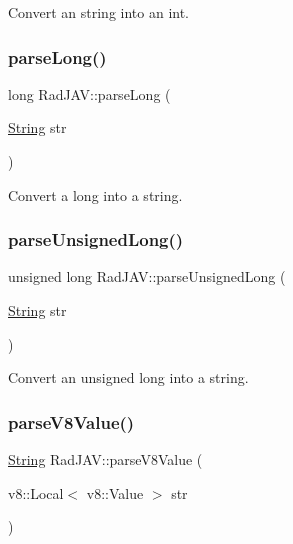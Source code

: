 Convert an string into an int. 

\mbox{\label{namespace_rad_j_a_v_a3ff124a25d6c3f369fb0c6549b8cc715}} 
\subsubsection{\texorpdfstring{parse\+Long()}{parseLong()}}
{\footnotesize\ttfamily long Rad\+J\+A\+V\+::parse\+Long (\begin{DoxyParamCaption}\item[{\mbox{\hyperlink{class_rad_j_a_v_1_1_string}{String}}}]{str }\end{DoxyParamCaption})}



Convert a long into a string. 

\mbox{\label{namespace_rad_j_a_v_ac8f5f34f742526d09fcc982780f97c43}} 
\subsubsection{\texorpdfstring{parse\+Unsigned\+Long()}{parseUnsignedLong()}}
{\footnotesize\ttfamily unsigned long Rad\+J\+A\+V\+::parse\+Unsigned\+Long (\begin{DoxyParamCaption}\item[{\mbox{\hyperlink{class_rad_j_a_v_1_1_string}{String}}}]{str }\end{DoxyParamCaption})}



Convert an unsigned long into a string. 

\mbox{\label{namespace_rad_j_a_v_a08d7731efefd73097db75edfda8f0b8e}} 
\subsubsection{\texorpdfstring{parse\+V8\+Value()}{parseV8Value()}}
{\footnotesize\ttfamily \mbox{\hyperlink{class_rad_j_a_v_1_1_string}{String}} Rad\+J\+A\+V\+::parse\+V8\+Value (\begin{DoxyParamCaption}\item[{v8\+::\+Local$<$ v8\+::\+Value $>$}]{str }\end{DoxyParamCaption})}

